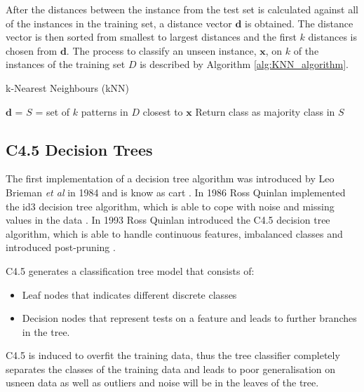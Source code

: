 \documentclass[10pt, conference]{IEEEtran}
\begin{document}
After the distances between the instance from the test set is calculated against all of the instances in the training set,
a distance vector $\boldsymbol{\textbf{d}}$ is obtained. The distance vector is then sorted from smallest to largest distances
and the first $k$ distances is chosen from $\boldsymbol{\textbf{d}}$. The process to classify an unseen instance,
$\boldsymbol{\textbf{x}}$, on $k$ of the instances of the training set $D$ is described by Algorithm \ref{alg:KNN_algorithm}.
\begin{algorithm}
\caption{k-Nearest Neighbours (kNN)}
\label{alg:KNN_algorithm}
\begin{algorithmic}[1]
            \State $\boldsymbol{\textbf{d}}$ = 
        \EndFor
        \State {}
        \State $S$ = set of $k$ patterns in $D$ closest to $\boldsymbol{\textbf{x}}$
        \State Return class as majority class in $S$
    \EndFunction
\end{algorithmic}
\end{algorithm}

\subsection{C4.5 Decision Trees}\label{CT_background}

The first implementation of a decision tree algorithm was introduced by Leo Brieman \textit{et al} in 1984 and
is know as \acrfull{cart} \cite{CART_ref}. In 1986 Ross Quinlan implemented the \acrfull{id3} decision tree
algorithm, which is able to cope with noise and missing values in the data \cite{ID3_ref}. In 1993 Ross Quinlan
introduced the C4.5 decision tree algorithm, which is able to handle continuous features, imbalanced classes and
introduced post-pruning \cite{C4.5_ref}.

C4.5 generates a classification tree model that consists of:
\begin{itemize}
    \item Leaf nodes that indicates different discrete classes
    \item Decision nodes that represent tests on a feature and leads to further branches in the tree.
\end{itemize}
C4.5 is induced to overfit the training data, thus the tree classifier completely separates the classes of the
training data and leads to poor generalisation on usneen data as well as outliers and noise will be in the leaves of
the tree.
\end{document}

